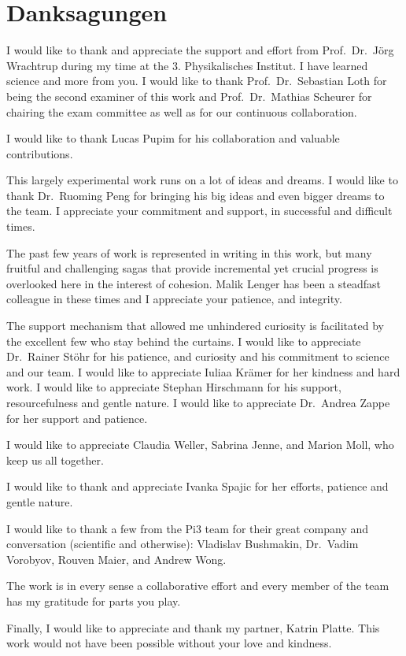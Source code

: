 \chapter*{Danksagungen}

I would like to thank and appreciate the support and effort from Prof.~Dr.~Jörg Wrachtrup during my time at the 3. Physikalisches Institut. I have learned science and more from you.
I would like to thank Prof.~Dr.~Sebastian Loth for being the second examiner of this work and Prof.~Dr.~Mathias Scheurer for chairing the exam committee as well as for our continuous collaboration.

I would like to thank Lucas Pupim for his collaboration and valuable contributions.

This largely experimental work runs on a lot of ideas and dreams. I would like to thank Dr.~Ruoming Peng for bringing his big ideas and even bigger dreams to the team. I appreciate your commitment and support, in successful and difficult times.

The past few years of work is represented in writing in this work, but many fruitful and challenging sagas that provide incremental yet crucial progress is overlooked here in the interest of cohesion. Malik Lenger has been a steadfast colleague in these times and I appreciate your patience, and integrity.

The support mechanism that allowed me unhindered curiosity is facilitated by the excellent few who stay behind the curtains. I would like to appreciate Dr.~Rainer Stöhr for his patience, and curiosity and his commitment to science and our team. I would like to appreciate Iuliaa Krämer for her kindness and hard work. I would like to appreciate Stephan Hirschmann for his support, resourcefulness and gentle nature. I would like to appreciate Dr.~Andrea Zappe for her support and patience.

I would like to appreciate Claudia Weller, Sabrina Jenne, and Marion Moll, who keep us all together.

I would like to thank and appreciate Ivanka Spajic for her efforts, patience and gentle nature.

I would like to thank a few from the Pi3 team for their great company and conversation (scientific and otherwise): Vladislav Bushmakin, Dr.~Vadim Vorobyov, Rouven Maier, and Andrew Wong. 

The work is in every sense a collaborative effort and every member of the team has my gratitude for parts you play.

Finally, I would like to appreciate and thank my partner, Katrin Platte. This work would not have been possible without your love and kindness. 